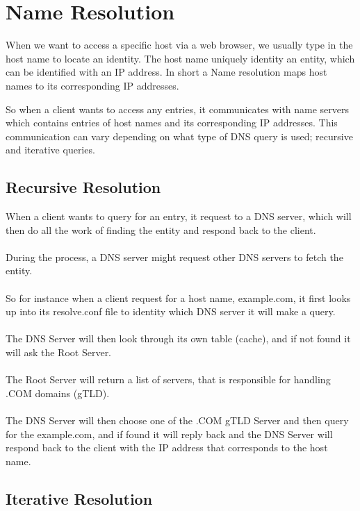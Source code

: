 \section{Name Resolution}

When we want to access a specific host via a web browser, we usually type in the host name to locate an identity. The host name uniquely identity an entity, which can be identified with an IP address. In short a Name resolution maps host names to its corresponding IP addresses. 

So when a client wants to access any entries, it communicates with name servers which contains entries  of host names and its corresponding IP addresses. This communication can vary depending on what type of DNS query is used; recursive and iterative queries. 

\subsection{Recursive Resolution}

When a client wants to query for an entry, it request to a DNS server, which will then do all the work of finding the entity and respond back to the client. \\\\During the process, a DNS server might request other DNS servers to fetch the entity. \\\\So for instance when a client request for a host name, example.com, it first looks up into its resolve.conf file to identity which DNS server it will make a query.  \\\\The DNS Server will then look through its own table (cache), and if not found it will ask the Root Server. \\\\The Root Server will return a list of servers, that is responsible for handling .COM domains (gTLD). \\\\The DNS Server will then choose one of the .COM gTLD Server and then query for the example.com, and if found it will reply back and the DNS Server will respond back to the client with the IP address that corresponds to the host name.

\subsection{Iterative Resolution}

